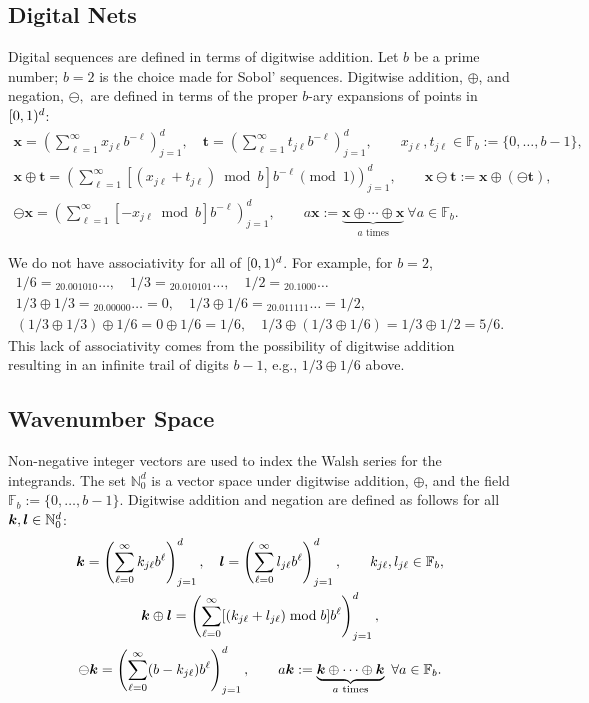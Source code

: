\documentclass{article}
\newcommand{\N}{\mathbb{N}} %
\newcommand{\F}{\mathbb{F}} %
\newcommand{\bst}{\boldsymbol{t}}    %
\newcommand{\bsx}{\boldsymbol{x}}    %
\begin{document}
\subsection{Digital Nets}


Digital sequences are defined in terms of digitwise addition.  Let $b$ be a prime number; $b=2$ is the choice made for Sobol' sequences.  Digitwise addition, $\oplus$, and negation, $\ominus,$ are defined in terms of the proper $b$-ary expansions of points in $[0,1)^d$:
\begin{gather*}
\bsx = \left(\sum_{\ell=1}^{\infty} x_{j\ell} b^{-\ell}\right)_{j=1}^d, \quad \bst = \left(\sum_{\ell=1}^{\infty} t_{j\ell} b^{-\ell}\right)_{j=1}^d, \qquad x_{j\ell}, t_{j\ell} \in \F_b:=\{0, \ldots, b-1\},\\
\bsx \oplus \bst = \left(\sum_{\ell=1}^{\infty} [(x_{j\ell} + t_{j\ell}) \bmod b] b^{-\ell} \pmod{1} \right)_{j=1}^d,\qquad \bsx \ominus \bst:=\bsx \oplus (\ominus \bst),\\
\ominus \bsx = \left(\sum_{\ell=1}^{\infty} [-x_{j\ell} \bmod b] b^{-\ell}\right)_{j=1}^d,  \qquad a \bsx:=\underbrace{\bsx \oplus \cdots \oplus \bsx}_{a \text{ times}}\ \forall a \in \F_b.
\end{gather*}

We do not have associativity for all of $[0,1)^d$.  For example, for $b=2$, 
\begin{gather*}
1/6={}_20.001010\ldots, \quad  1/3={}_20.010101\ldots,\quad 1/2 = {}_20.1000\dots\\
1/3\oplus 1/3={}_20.00000\ldots =0, \quad 1/3\oplus1/6={}_20.011111\ldots=1/2,\\
 (1/3\oplus1/3)\oplus1/6=0 \oplus 1/6 = 1/6, \quad 1/3\oplus(1/3\oplus1/6)=1/3 \oplus 1/2 = 5/6.
\end{gather*}
This lack of associativity comes from the possibility of digitwise addition resulting in an infinite trail of digits $b-1$, e.g., $1/3\oplus1/6$ above.  

\subsection{Wavenumber Space}
Non-negative integer vectors are used to index the Walsh series for the integrands.  The set $\N_0^d$ is a vector space under digitwise addition, $\oplus$, and the field $\F_b:=\{0,\dots,b-1\}$.  Digitwise addition and negation are defined as follows for  all $\bsk, \bsl \in \N_0^d$: 
\begin{gather*}
\bsk =  \left(\sum_{\ell=0}^{\infty} k_{j\ell} b^{\ell}\right)_{j=1}^d, \quad \bsl =  \left(\sum_{\ell=0}^{\infty} l_{j\ell} b^{\ell}\right)_{j=1}^d, \qquad k_{j\ell}, l_{j\ell} \in \F_b, \\
\bsk \oplus \bsl = \left(\sum_{\ell=0}^{\infty} [(k_{j\ell} + l_{j\ell}) \bmod b] b^{\ell}\right)_{j=1}^d, \\
\ominus \bsk = \left(\sum_{\ell=0}^{\infty} (b-k_{j\ell}) b^{\ell}\right)_{j=1}^d, \qquad
a \bsk:=\underbrace{\bsk \oplus \cdots \oplus \bsk}_{a \text{ times}}\ \forall a \in \F_b.
\end{gather*}
\end{document}
